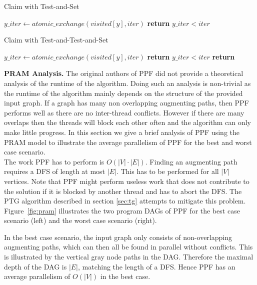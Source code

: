 \documentclass[letterpaper]{article}
\newcommand{\mypar}[1]{{\bf #1.}}
\begin{document}
\begin{algorithm}
    \caption{Claim with Test-and-Set}
    \label{alg:claim_tas}
    \begin{algorithmic}[1]
            \State $y\_iter \gets atomic\_exchange(visited[y], iter)$
            \State \textbf{return} $y\_iter < iter$
        \EndProcedure
    \end{algorithmic}
\end{algorithm}


\begin{algorithm}
    \caption{Claim with Test-and-Test-and-Set}
    \label{alg:claim_ttas}
    \begin{algorithmic}[1]
                \State $y\_iter \gets atomic\_exchange(visited[y], iter)$
                \State \textbf{return} $y\_iter < iter$
            \EndIf
            \State \textbf{return} \False
        \EndProcedure
    \end{algorithmic}
\end{algorithm}

\mypar{PRAM Analysis} The original authors of PPF did not provide a theoretical analysis of the runtime of the algorithm.
Doing such an analysis is non-trivial as the runtime of the algorithm mainly depends on the structure of the provided
input graph. If a graph has many non overlapping augmenting paths, then PPF performs well as there are no inter-thread conflicts. 
However if there are many overlaps then the threads will block each other often and the algorithm can only make little progress.
In this section we give a brief analysis of PPF using the PRAM model to illustrate the average parallelism of PPF for the best and worst case
scenario. \\

The work PPF has to perform is $O(|V|\cdot|E|)$. Finding an augmenting path requires a DFS of length at most $|E|$. 
This has to be performed for all $|V|$ vertices. Note that PPF might perform useless work that does not contribute to the solution
if it is blocked by another thread and has to abort the DFS. 
The PTG algorithm described in section \ref{sec:tg} attempts to mitigate this problem.\\

Figure~\ref{fig:pram} illustrates the two program DAGs of PPF for the best case scenario (left) and the worst case scenario (right).

In the best case scenario, the input graph only consists of non-overlapping augmenting paths, which can then all be found in parallel without conflicts. 
This is illustrated by the vertical gray node paths in the DAG.
Therefore the maximal depth of the DAG is $|E|$, matching the length of a DFS. Hence PPF has an average parallelism of $O(|V|)$ in the best case.
\end{document}

